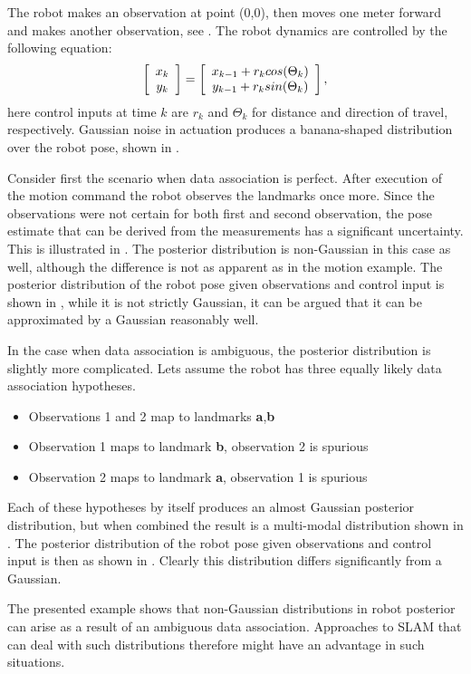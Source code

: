 The robot makes an observation at point (0,0), then moves one meter
forward and makes another observation,
see . The robot dynamics are controlled by
the following equation:
$$
  \left[\begin{array}{c} x_k\\y_k \end{array} \right] = \left[\begin{array}{c}  x_{k-1} + r_k cos(\Theta_k)\\
                               y_{k-1} + r_k sin(\Theta_k)  \end{array} \right],
$$
here control inputs at time $k$ are $r_k$ and $\Theta_k$ for distance
and direction of travel, respectively. Gaussian noise in actuation
produces a banana-shaped distribution over the robot pose, shown in
.

Consider first the scenario when data association is perfect. After
execution of the motion command the robot observes the landmarks once
more. Since the observations were not certain for both first and
second observation, the pose estimate that can be derived from the
measurements has a significant uncertainty. This is illustrated in
. The posterior distribution is non-Gaussian
in this case as well, although the difference is not as apparent as in
the motion example. The posterior distribution of the robot pose given
observations and control input is shown in
, while it is not strictly Gaussian, it can
be argued that it can be approximated by a Gaussian reasonably well.

In the case when data association is ambiguous, the posterior
distribution is slightly more complicated. Lets assume the robot has
three equally likely data association hypotheses. 

\begin{itemize}
\item Observations 1 and 2 map to landmarks {\bf a},{\bf b}
\item Observation 1 maps to landmark {\bf b}, observation 2 is spurious
\item Observation 2 maps to landmark {\bf a}, observation 1 is spurious
\end{itemize}

Each of these hypotheses by itself produces an almost Gaussian
posterior distribution, but when combined the result is a multi-modal
distribution shown in . The posterior
distribution of the robot pose given observations and control input is
then as shown in . Clearly this
distribution differs significantly from a Gaussian.

The presented example shows that non-Gaussian distributions in robot
posterior can arise as a result of an ambiguous data
association. Approaches to SLAM that can deal with such distributions
therefore might have an advantage in such situations.


